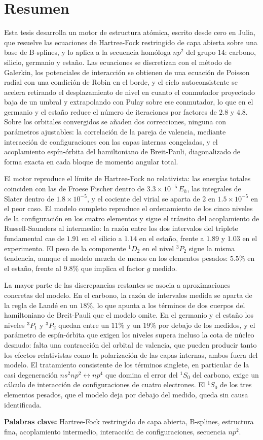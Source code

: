\chapter*{Resumen}
\label{ch:resumen}

Esta tesis desarrolla un motor de estructura atómica, escrito desde cero en Julia, que resuelve las ecuaciones de Hartree-Fock restringido de capa abierta sobre una base de B-splines, y lo aplica a la secuencia homóloga $np^2$ del grupo 14: carbono, silicio, germanio y estaño. Las ecuaciones se discretizan con el método de Galerkin, los potenciales de interacción se obtienen de una ecuación de Poisson radial con una condición de Robin en el borde, y el ciclo autoconsistente se acelera retirando el desplazamiento de nivel en cuanto el conmutador proyectado baja de un umbral y extrapolando con Pulay sobre ese conmutador, lo que en el germanio y el estaño reduce el número de iteraciones por factores de $2.8$ y $4.8$. Sobre los orbitales convergidos se añaden dos correcciones, ninguna con parámetros ajustables: la correlación de la pareja de valencia, mediante interacción de configuraciones con las capas internas congeladas, y el acoplamiento espín-órbita del hamiltoniano de Breit-Pauli, diagonalizado de forma exacta en cada bloque de momento angular total.

El motor reproduce el límite de Hartree-Fock no relativista: las energías totales coinciden con las de Froese Fischer dentro de $3.3\times10^{-5}\,E_h$, las integrales de Slater dentro de $1.8\times10^{-5}$, y el cociente del virial se aparta de 2 en $1.5\times10^{-5}$ en el peor caso. El modelo completo reproduce el ordenamiento de los cinco niveles de la configuración en los cuatro elementos y sigue el tránsito del acoplamiento de Russell-Saunders al intermedio: la razón entre los dos intervalos del triplete fundamental cae de $1.91$ en el silicio a $1.14$ en el estaño, frente a $1.89$ y $1.03$ en el experimento. El peso de la componente $^1D_2$ en el nivel $^3P_2$ sigue la misma tendencia, aunque el modelo mezcla de menos en los elementos pesados: $5.5\%$ en el estaño, frente al $9.8\%$ que implica el factor $g$ medido.

La mayor parte de las discrepancias restantes se asocia a aproximaciones concretas del modelo. En el carbono, la razón de intervalos medida se aparta de la regla de Landé en un $18\%$, lo que apunta a los términos de dos cuerpos del hamiltoniano de Breit-Pauli que el modelo omite. En el germanio y el estaño los niveles $^3P_1$ y $^3P_2$ quedan entre un $11\%$ y un $19\%$ por debajo de los medidos, y el parámetro de espín-órbita que exigen los niveles supera incluso la cota de núcleo desnudo: falta una contracción del orbital de valencia, que pueden producir tanto los efectos relativistas como la polarización de las capas internas, ambos fuera del modelo. El tratamiento consistente de los términos singlete, en particular de la casi degeneración $ns^2np^2 \leftrightarrow np^4$ que domina el error del $^1S_0$ del carbono, exige un cálculo de interacción de configuraciones de cuatro electrones. El $^1S_0$ de los tres elementos pesados, que el modelo deja por debajo del medido, queda sin causa identificada.

\vspace{1em}
\noindent\textbf{Palabras clave:} Hartree-Fock restringido de capa abierta, B-splines, estructura fina, acoplamiento intermedio, interacción de configuraciones, secuencia $np^2$.

